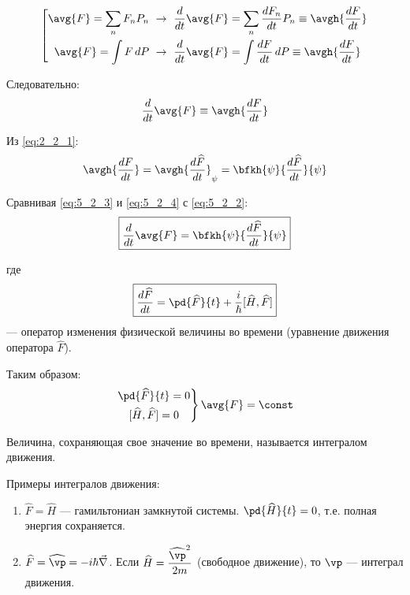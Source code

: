 $$
\left[
\begin{gathered}
\avg{F} = \sum_n F_n P_n ~\rightarrow~ \frac{d}{dt}\avg{F}=\sum_n \frac{dF_n}{dt}P_n \equiv \avgh{\frac{dF}{dt}}\\
\avg{F} = \int F\,dP ~\rightarrow~ \frac{d}{dt}\avg{F}=\int \frac{dF}{dt}\,dP \equiv \avgh{\frac{dF}{dt}}\\
\end{gathered}
\right.
$$

Следовательно:
\begin{equation}
\label{eq:5_2_3}
\frac{d}{dt} \avg{F} \equiv \avgh{\frac{dF}{dt}}
\end{equation}

Из \eqref{eq:2_2_1}:
\begin{equation}
\label{eq:5_2_4}
\avgh{\frac{dF}{dt}} = \avgh{\frac{d \widehat{F}}{dt}}_{\psi} = \bfkh{\psi}{\frac{d \widehat{F}}{dt}}{\psi}
\end{equation}

Сравнивая \eqref{eq:5_2_3} и \eqref{eq:5_2_4} с \eqref{eq:5_2_2}:
\begin{equation}
\label{eq:5_2_5}
\boxed{\frac{d}{dt} \avg{F} = \bfkh{\psi}{\frac{d \widehat{F}}{dt}}{\psi}}
\end{equation}

где
\begin{equation}
\label{eq:5_2_6}
\boxed{\frac{d\widehat{F}}{dt} = \pd{\widehat{F}}{t} + \frac{i}{\hbar} [\widehat{H}, \widehat{F}]}
\end{equation}
--- оператор изменения физической величины во времени (уравнение движения оператора $\widehat{F}$).

Таким образом:
$$
\left.
\begin{gathered}
\pd{\widehat{F}}{t}=0 \\
[\widehat{H}, \widehat{F}]=0
\end{gathered}
\right\} \avg{F}=\const
$$

\begin{defn}
Величина, сохраняющая свое значение во времени, называется интегралом движения.
\end{defn}

Примеры интегралов движения:
\begin{enumerate}
\item $\widehat{F} = \widehat{H}$ --- гамильтониан замкнутой системы. $\pd{\widehat{H}}{t}=0$, т.е. полная энергия сохраняется.
\item $\widehat{F} = \widehat{\vp} = - i \hbar \vec{\nabla}$.  Если $\displaystyle\widehat{H} = \frac{\widehat{\vp}^2}{2m}$ (свободное движение), то $\vp$ --- интеграл движения.
\end{enumerate}

